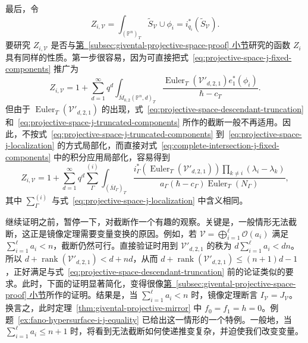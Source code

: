 最后，令
\[
Z_{i,\mathcal V}=\int_{(\mathbb P^n)_T}\widetilde S_{\mathcal V}\cup\phi_i=i_{q_i}^*(\widetilde S_{\mathcal V}).
\]
要研究 $Z_{i,\mathcal V}$ 是否与\hyperref[subsec:givental-projective-space-proof]{第~\ref*{subsec:givental-projective-space-proof} 小节}研究的函数 $Z_i$ 具有同样的性质。第一步很容易，因为可直接把式~\eqref{eq:projective-space-j-fixed-components} 推广为
\begin{equation}\label{eq:complete-intersection-j-fixed-components}
Z_{i,\mathcal V}=1+\sum_{d=1}^{\infty}q^d
\int_{\overline M_{0,2}(\mathbb P^n,d)_T}\frac{\operatorname{Euler}_T(\mathcal V'_{d,2,1})e_1^*(\phi_i)}{\hbar-c_T}.
\end{equation}
但由于 $\operatorname{Euler}_T(\mathcal V'_{d,2,1})$ 的出现，式~\eqref{eq:projective-space-descendant-truncation} 和~\eqref{eq:projective-space-j-truncated-components} 所作的截断一般不再适用。因此，不按式~\eqref{eq:projective-space-j-truncated-components} 到~\eqref{eq:projective-space-j-localization} 的方式局部化，而直接对式~\eqref{eq:complete-intersection-j-fixed-components} 中的积分应用局部化，容易得到
\begin{equation}\label{eq:complete-intersection-j-localization}
Z_{i,\mathcal V}=1+\sum_{d=1}^{\infty}q^d\sum_\Gamma^{(i)}
\int_{(\overline M_\Gamma)_T}\frac{i_\Gamma^*(\operatorname{Euler}_T(\mathcal V'_{d,2,1}))\prod_{k\ne i}(\lambda_i-\lambda_k)}{a_\Gamma(\hbar-c_\Gamma)\operatorname{Euler}_T(N_\Gamma)},
\end{equation}
其中 $\sum_\Gamma^{(i)}$ 与式~\eqref{eq:projective-space-j-localization} 中含义相同。

继续证明之前，暂停一下，对截断作一个有趣的观察。关键是，一般情形无法截断，这正是镜像定理需要变量变换的原因。例如，若 $\mathcal V=\bigoplus_{i=1}^{\ell}\mathcal O(a_i)$ 满足 $\sum_{i=1}^{\ell}a_i<n$，截断仍然可行。直接验证时用到 $\mathcal V'_{d,2,1}$ 的秩为 $d\sum_{i=1}^{\ell}a_i<dn$。所以 $d+\operatorname{rank}(\mathcal V'_{d,2,1})<d+nd$，从而 $d+\operatorname{rank}(\mathcal V'_{d,2,1})\le(n+1)d-1$，正好满足与式~\eqref{eq:projective-space-descendant-truncation} 前的论证类似的要求。此时，下面的证明显著简化，变得很像\hyperref[subsec:givental-projective-space-proof]{第~\ref*{subsec:givental-projective-space-proof} 小节}所作的证明。结果是，当 $\sum_{i=1}^{\ell}a_i<n$ 时，镜像定理断言 $I_{\mathcal V}=J_{\mathcal V}$。换言之，此时定理~\ref{thm:givental-projective-mirror} 中 $f_0=f_1=h=0$。例题~\ref{ex:fano-hypersurface-i-j-equality} 已给出这一情形的一个特例。一般地，当 $\sum_{i=1}^{\ell}a_i\le n+1$ 时，将看到无法截断如何使递推变复杂，并迫使我们改变变量。

